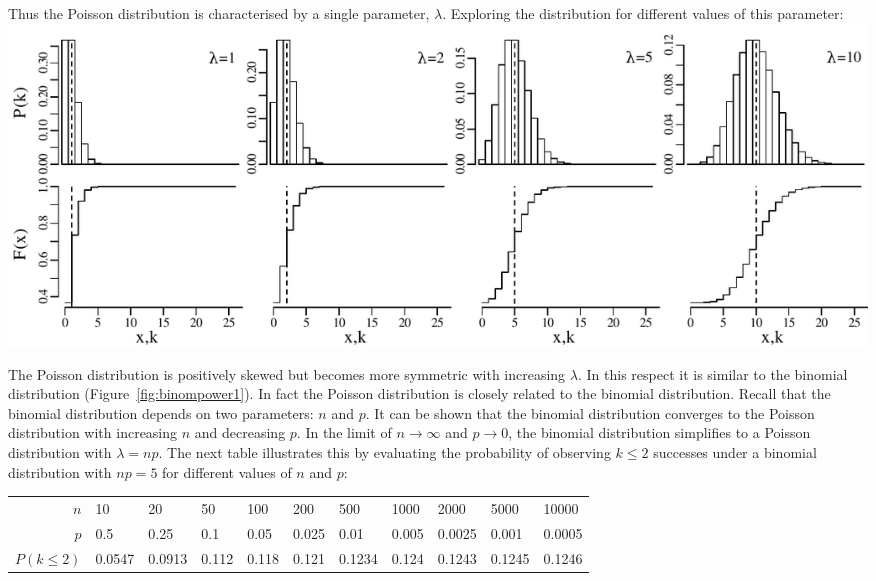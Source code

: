 Thus the Poisson distribution is characterised by a single parameter,
$\lambda$. Exploring the distribution for different values of this
parameter:\\

\noindent\includegraphics[width=\textwidth]{../figures/increasinglambda.pdf}
\begingroup {} \endgroup

The Poisson distribution is positively skewed but becomes more
symmetric with increasing $\lambda$. In this respect it is similar to
the binomial distribution (Figure~\ref{fig:binompower1}). In fact the
Poisson distribution is closely related to the binomial
distribution. Recall that the binomial distribution depends on two
parameters: $n$ and $p$. It can be shown that the binomial
distribution converges to the Poisson distribution with increasing $n$
and decreasing $p$. In the limit of $n \rightarrow \infty$ and $p
\rightarrow 0$, the binomial distribution simplifies to a Poisson
distribution with $\lambda = {n}{p}$. The next table illustrates this
by evaluating the probability of observing $k\leq{2}$ successes under
a binomial distribution with $np=5$ for different values of $n$ and
$p$:\\

\begin{center}
\begin{tabular}{r|llllllllll}
$n$ & 10 & 20 & 50 & 100 & 200 & 500 & 1000 & 2000 & 5000 & 10000 \\
$p$ & 0.5 & 0.25 & 0.1 & 0.05 & 0.025 & 0.01 & 0.005 & 0.0025 & 0.001 & 0.0005 \\
$P(k\leq{2})$ & 0.0547 & 0.0913 & 0.112 & 0.118 & 0.121 & 0.1234 & 0.124 & 0.1243 & 0.1245 & 0.1246\\
\end{tabular}
\end{center}

